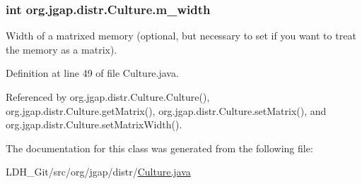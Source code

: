 \hypertarget{classorg_1_1jgap_1_1distr_1_1_culture_a1db817855b51fdbecdb7ee0f81150be5}{
\subsubsection[{m\-\_\-width}]{\setlength{\rightskip}{0pt plus 5cm}int org.\-jgap.\-distr.\-Culture.\-m\-\_\-width\hspace{0.3cm}{\ttfamily [private]}}}\label{classorg_1_1jgap_1_1distr_1_1_culture_a1db817855b51fdbecdb7ee0f81150be5}
Width of a matrixed memory (optional, but necessary to set if you want to treat the memory as a matrix). 

Definition at line 49 of file Culture.\-java.



Referenced by org.\-jgap.\-distr.\-Culture.\-Culture(), org.\-jgap.\-distr.\-Culture.\-get\-Matrix(), org.\-jgap.\-distr.\-Culture.\-set\-Matrix(), and org.\-jgap.\-distr.\-Culture.\-set\-Matrix\-Width().



The documentation for this class was generated from the following file\-:\begin{DoxyCompactItemize}
\item 
L\-D\-H\-\_\-\-Git/src/org/jgap/distr/\hyperlink{_culture_8java}{Culture.\-java}\end{DoxyCompactItemize}
